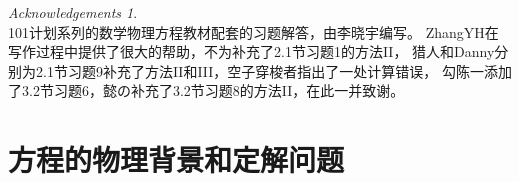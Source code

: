 \theoremstyle{plain}\newtheorem*{lemma*}{引理}
\theoremstyle{plain}\newtheorem*{formula*}{公式}
\theoremstyle{plain}\newtheorem*{proposition1}{弱极值原理}
\theoremstyle{plain}\newtheorem*{proposition2}{强极值原理}
\theoremstyle{plain}\newtheorem*{theo}{定理}
\newcommand\tbbint{{-\mkern -16mu\int}}
\newcommand\dbbint{{-\mkern -19mu\int}}
\newcommand\intbar{{\mathchoice{\dbbint}{\tbbint}{\tbbint}{\tbbint}}}
\renewcommand\thesection{2.\arabic{section}}
\theoremstyle{remark}\newtheorem*{ack*}{Acknowledgements}

\begin{ack*}\\
    101计划系列的数学物理方程教材配套的习题解答，由李晓宇编写。
    ZhangYH在写作过程中提供了很大的帮助，不为补充了2.1节习题1的方法II，
    猎人和Danny分别为2.1节习题9补充了方法II和III，空子穿梭者指出了一处计算错误，
    勾陈一添加了3.2节习题6，懿の补充了3.2节习题8的方法II，在此一并致谢。
\end{ack*}

\section{方程的物理背景和定解问题}
	
